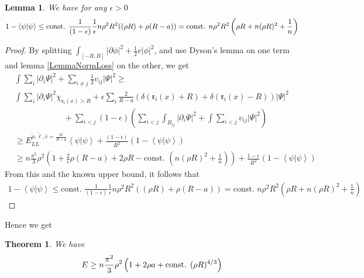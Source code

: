 \documentclass[a4paper,11pt]{article}
\newcommand{\abs}[1]{\left\lvert #1 \right\rvert}
\renewcommand{\braket}[1]{\left\langle#1\right\rangle}
\newtheorem{theorem}{Theorem}
\newtheorem{lemma}{Lemma}
\numberwithin{equation}{section}
\begin{document}
	\begin{lemma}\label{LemmaMassBound}
		We have for any $ \epsilon>0 $
			\begin{equation}\label{EqMassBound}
			\begin{aligned}
			1-\braket{\psi|\psi} \leq \text{const. }\frac{1}{(1-\epsilon)}\frac{1}{\epsilon}n\rho^2 R^2((\rho R)+\rho(R-a))=\textnormal{const. }n\rho^2R^2\left(\rho R+ n(\rho R)^2+\frac{1}{n}\right)
			\end{aligned}
			\end{equation}
	\end{lemma}
	\begin{proof}
	By splitting $ \int_{[-R,R]}\abs{\partial\phi}^2+\frac12 v\abs{\phi}^2 $, and use Dyson's lemma on one term and lemma \ref{LemmaNormLoss} on the other, we get\begin{equation}
	\begin{aligned}
	&\int \sum_{i}\abs{\partial_i\Psi}^2+\sum_{i\neq j} \frac{1}{2}v_{ij}\abs{\Psi}^2\geq\\ &\int\sum_{i}\abs{\partial_i\Psi}^2\chi_{\mathfrak{r}_i(x)>R}+\epsilon\sum_{i}\frac{2}{R-a}(\delta(\mathfrak{r}_i(x)+R)+\delta(\mathfrak{r}_i(x)-R))\abs{\Psi}^2\\&\qquad\qquad\qquad+\sum_{i< j} (1-\epsilon)\left(\sum_{i<j}\int_{B_{ij}}\abs{\partial_i \Psi}^2+\int\sum_{i<j} v_{ij} \abs{\Psi}^2\right)\\
	&\geq E_{LL}^{\tilde{\rho},\tilde{\ell},\tilde{c}=\frac{2\epsilon}{R-a}}\braket{\psi|\psi}+ \frac{(1-\epsilon)}{R^2}(1-\braket{\psi|\psi})\\
	&\geq n\frac{\pi^2}{3}\rho^2\left(1+\frac{2}{\epsilon}\rho(R-a)+2\rho R-\text{const. }\left(n(\rho R)^2+\frac{1}{n}\right)\right)+\frac{1-\epsilon}{R^2}(1-\braket{\psi|\psi})
	\end{aligned}
	\end{equation}
	From this and the known upper bound, it follows that 
	\begin{equation}
	\begin{aligned}
	 1-\braket{\psi|\psi} \leq \text{const. }\frac{1}{(1-\epsilon)}\frac{1}{\epsilon}n\rho^2 R^2((\rho R)+\rho(R-a))=\text{const. }n\rho^2R^2\left(\rho R+ n(\rho R)^2+\frac{1}{n}\right)
	\end{aligned}
	\end{equation}
	\end{proof}
	Hence we get
	\begin{theorem}\label{TheoremLowerBound}
		We have \begin{equation}
		E\geq n\frac{\pi^2}{3}\rho^2\left(1+2\rho a+\textnormal{const. }(\rho R)^{4/3}\right)
		\end{equation}
	\end{theorem}
\end{document}

